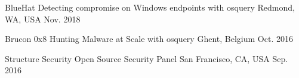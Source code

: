 \begin{cvhonors}

\cvhonor
{BlueHat} %
{Detecting compromise on Windows endpoints with osquery} %
{Redmond, WA, USA} %
{Nov. 2018} %


\cvhonor
{Brucon 0x8} %
{Hunting Malware at Scale with osquery} %
{Ghent, Belgium} %
{Oct. 2016} %


\cvhonor
{Structure Security} %
{Open Source Security Panel} %
{San Francisco, CA, USA} %
{Sep. 2016} %


\end{cvhonors}
